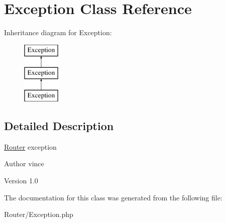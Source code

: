 \hypertarget{class_anemo_1_1_router_1_1_exception}{
\section{Exception Class Reference}
\label{class_anemo_1_1_router_1_1_exception}
}
Inheritance diagram for Exception:\begin{figure}[H]
\begin{center}
\leavevmode
\includegraphics[height=3.000000cm]{class_anemo_1_1_router_1_1_exception}
\end{center}
\end{figure}


\subsection{Detailed Description}
\hyperlink{class_anemo_1_1_router}{Router} exception \begin{DoxyAuthor}{Author}
vince 
\end{DoxyAuthor}
\begin{DoxyVersion}{Version}
1.0 
\end{DoxyVersion}


The documentation for this class was generated from the following file:\begin{DoxyCompactItemize}
\item 
Router/Exception.php\end{DoxyCompactItemize}
